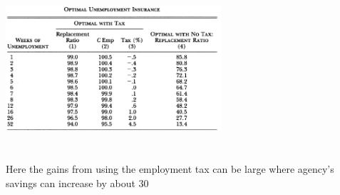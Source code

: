 \documentclass{article}
\begin{document}
\begin{itemize}
    \newline
    \begin{center}
        \includegraphics[width=8cm, height=6cm]{pic28}
    \end{center}
    Here the gains from using the employment tax can be large where agency's savings can increase by about 30%
\end{itemize}
\end{document}
